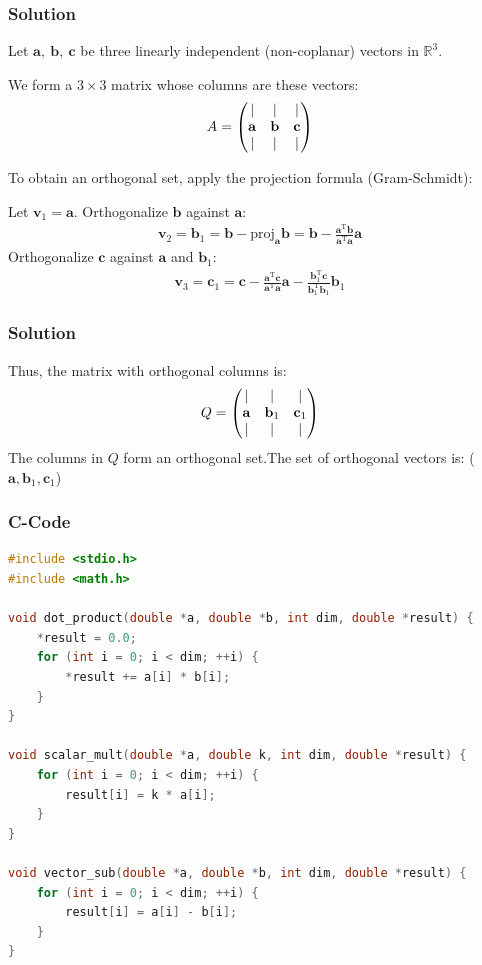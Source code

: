 \documentclass{beamer}
\begin{document}
\begin{frame}
\frametitle{Solution}
Let $\mathbf{a},\ \mathbf{b},\ \mathbf{c}$ be three linearly independent (non-coplanar) vectors in $\mathbb{R}^3$. 

We form a $3 \times 3$ matrix whose columns are these vectors:
\begin{align}
A = \begin{pmatrix}| & | & | \\ \mathbf{a} & \mathbf{b} & \mathbf{c} \\ | & | & |\end{pmatrix}
\end{align}

To obtain an orthogonal set, apply the projection formula (Gram-Schmidt):

Let $\mathbf{v}_1 = \mathbf{a}$.
Orthogonalize $\mathbf{b}$ against $\mathbf{a}$:
\begin{align}
\mathbf{v}_2 = \mathbf{b}_1 = \mathbf{b} - \mathrm{proj}_{\mathbf{a}} \mathbf{b}
= \mathbf{b} - \frac{\mathbf{a}^\mathrm{T} \mathbf{b}}{\mathbf{a}^\mathrm{T} \mathbf{a}} \mathbf{a}
\end{align}
Orthogonalize $\mathbf{c}$ against $\mathbf{a}$ and $\mathbf{b}_1$:
\begin{align}
\mathbf{v}_3 = \mathbf{c}_1 
= \mathbf{c} - \frac{\mathbf{a}^\mathrm{T}\mathbf{c}}{\mathbf{a}^\mathrm{T}\mathbf{a}} \mathbf{a} 
  - \frac{\mathbf{b}_1^\mathrm{T}\mathbf{c}}{\mathbf{b}_1^\mathrm{T}\mathbf{b}_1} \mathbf{b}_1
\end{align}
\end{frame}
\begin{frame}
\frametitle{Solution}
Thus, the matrix with orthogonal columns is:
\begin{align}
Q = \begin{pmatrix}| & | & | \\ \mathbf{a} & \mathbf{b}_1 & \mathbf{c}_1 \\ | & | & | \end{pmatrix}
\end{align}
The columns in $Q$ form an orthogonal set.The set of orthogonal vectors is:
($\mathbf{a},\mathbf{b}_1,\mathbf{c}_1$)
\end{frame}

\begin{frame}[fragile]
\frametitle{C-Code}
\begin{lstlisting}[language=C]
#include <stdio.h>
#include <math.h>

void dot_product(double *a, double *b, int dim, double *result) {
    *result = 0.0;
    for (int i = 0; i < dim; ++i) {
        *result += a[i] * b[i];
    }
}

void scalar_mult(double *a, double k, int dim, double *result) {
    for (int i = 0; i < dim; ++i) {
        result[i] = k * a[i];
    }
}

void vector_sub(double *a, double *b, int dim, double *result) {
    for (int i = 0; i < dim; ++i) {
        result[i] = a[i] - b[i];
    }
}
\end{lstlisting}
\end{frame}
\end{document}
